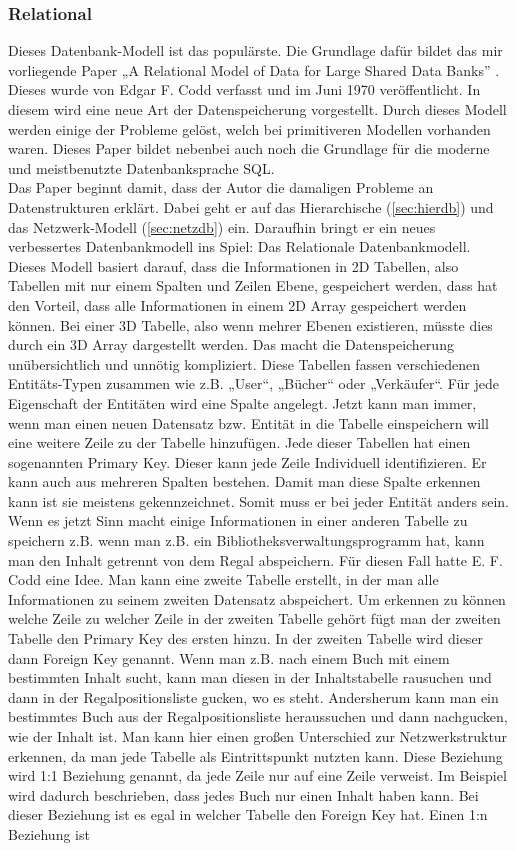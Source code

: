\documentclass[a4paper, 12pt]{article}
\theoremstyle{plain}
\theoremstyle{definition}
\begin{document}
	\subsubsection{Relational}
	\label{sec:reldb}
	Dieses Datenbank-Modell ist das populärste. Die Grundlage dafür bildet das mir vorliegende Paper „A Relational Model of Data for Large Shared Data Banks” \cite{Codd1970}. Dieses wurde von Edgar F. Codd verfasst und im Juni 1970 veröffentlicht. In diesem wird eine neue Art der Datenspeicherung vorgestellt. Durch dieses Modell werden einige der Probleme gelöst, welch bei primitiveren Modellen vorhanden waren. Dieses Paper bildet nebenbei auch noch die Grundlage für die moderne und meistbenutzte Datenbanksprache SQL. \\
Das Paper beginnt damit, dass der Autor die damaligen Probleme an Datenstrukturen erklärt. Dabei geht er auf das Hierarchische (\ref{sec:hierdb}) und das Netzwerk-Modell (\ref{sec:netzdb}) ein. Daraufhin bringt er ein neues verbessertes Datenbankmodell ins Spiel: Das Relationale Datenbankmodell. Dieses Modell basiert darauf, dass die Informationen in 2D Tabellen, also Tabellen mit nur einem Spalten und Zeilen Ebene, gespeichert werden, dass hat den Vorteil, dass alle Informationen in einem 2D Array gespeichert werden können. Bei einer 3D Tabelle, also wenn mehrer Ebenen existieren, müsste dies durch ein 3D Array dargestellt werden. Das macht die Datenspeicherung unübersichtlich und unnötig kompliziert. Diese Tabellen fassen verschiedenen Entitäts-Typen zusammen wie z.B. „User“, „Bücher“ oder „Verkäufer“. Für jede Eigenschaft der Entitäten wird eine Spalte angelegt. Jetzt kann man immer, wenn man einen neuen Datensatz bzw. Entität in die Tabelle einspeichern will eine weitere Zeile zu der Tabelle hinzufügen. Jede dieser Tabellen hat einen sogenannten Primary Key. Dieser kann jede Zeile Individuell identifizieren. Er kann auch aus mehreren Spalten bestehen. Damit man diese Spalte erkennen kann ist sie meistens gekennzeichnet. Somit muss er bei jeder Entität anders sein. Wenn es jetzt Sinn macht einige Informationen in einer anderen Tabelle zu speichern z.B. wenn man z.B. ein Bibliotheksverwaltungsprogramm hat, kann man den Inhalt getrennt von dem Regal abspeichern.  Für diesen Fall hatte E. F. Codd eine Idee. Man kann eine zweite Tabelle erstellt, in der man alle Informationen zu seinem zweiten Datensatz abspeichert. Um erkennen zu können welche Zeile zu welcher Zeile in der zweiten Tabelle gehört fügt man der zweiten Tabelle den Primary Key des ersten hinzu. In der zweiten Tabelle wird dieser dann Foreign Key genannt. Wenn man z.B. nach einem Buch mit einem bestimmten Inhalt sucht, kann man diesen in der Inhaltstabelle rausuchen und dann in der Regalpositionsliste gucken, wo es steht. Andersherum kann man ein bestimmtes Buch aus der Regalpositionsliste heraussuchen und dann nachgucken, wie der Inhalt ist. Man kann hier einen großen Unterschied zur Netzwerkstruktur erkennen, da man jede Tabelle als Eintrittspunkt nutzten kann. Diese Beziehung wird 1:1 Beziehung genannt, da jede Zeile nur auf eine Zeile verweist. Im Beispiel wird dadurch beschrieben, dass jedes Buch nur einen Inhalt haben kann. Bei dieser Beziehung ist es egal in welcher Tabelle den Foreign Key hat. Einen 1:n Beziehung ist 
\end{document}
